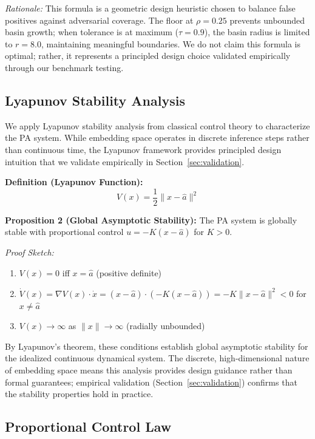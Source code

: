 \documentclass[11pt,a4paper]{article}
\begin{document}
\textit{Rationale:} This formula is a geometric design heuristic chosen to balance false positives against adversarial coverage. The floor at $\rho=0.25$ prevents unbounded basin growth; when tolerance is at maximum ($\tau=0.9$), the basin radius is limited to $r=8.0$, maintaining meaningful boundaries. We do not claim this formula is optimal; rather, it represents a principled design choice validated empirically through our benchmark testing.

\subsection{Lyapunov Stability Analysis}

We apply Lyapunov stability analysis from classical control theory to characterize the PA system. While embedding space operates in discrete inference steps rather than continuous time, the Lyapunov framework provides principled design intuition that we validate empirically in Section~\ref{sec:validation}.

\textbf{Definition (Lyapunov Function):}
\begin{equation}
V(x) = \frac{1}{2}\|x - \hat{a}\|^2
\end{equation}

\textbf{Proposition 2 (Global Asymptotic Stability):} The PA system is globally stable with proportional control $u = -K(x - \hat{a})$ for $K > 0$.

\textit{Proof Sketch:}
\begin{enumerate}
\item $V(x) = 0$ iff $x = \hat{a}$ (positive definite)
\item $\dot{V}(x) = \nabla V(x) \cdot \dot{x} = (x - \hat{a}) \cdot (-K(x - \hat{a})) = -K\|x - \hat{a}\|^2 < 0$ for $x \neq \hat{a}$
\item $V(x) \to \infty$ as $\|x\| \to \infty$ (radially unbounded)
\end{enumerate}

By Lyapunov's theorem, these conditions establish global asymptotic stability for the idealized continuous dynamical system. The discrete, high-dimensional nature of embedding space means this analysis provides design guidance rather than formal guarantees; empirical validation (Section~\ref{sec:validation}) confirms that the stability properties hold in practice.

\subsection{Proportional Control Law}
\end{document}
